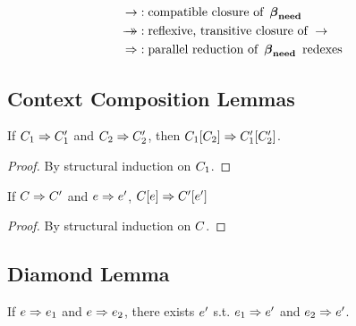 \documentclass{article}
\begin{document}

%
\begin{align*}
\step&: \textrm{compatible closure of } \betaneednr \\
\steps&: \textrm{reflexive, transitive closure of } \step \\
\pstep&: \textrm{parallel reduction of } \betaneednr \textrm{ redexes}
\end{align*}





%
%

\subsection{Context Composition Lemmas}

\begin{lemma}
\label{lem:EE}
If $\C_1 \pstep \C_1'$ and $\C_2 \pstep \C_2'$, then $\inC[_1]{\C_2} \pstep
\inC[_1']{\C_2'}$.
\end{lemma}

\begin{proof}
  By structural induction on $\C_1$.
\end{proof}

\begin{lemma}
\label{lem:Ee}
If $\C \pstep \C'$ and $\e \pstep \e'$, $\inC{\e} \pstep \inC[']{\e'}$
\end{lemma}

\begin{proof}
  By structural induction on $\C$.
\end{proof}



%
%

\subsection{Diamond Lemma}

\begin{lemma}
\label{lem:diamond}
If $\e \pstep \e_1$ and $\e \pstep \e_2$, there exists $\e'$ s.t. $\e_1 \pstep
\e'$ and $\e_2 \pstep \e'$.
\end{lemma}
\end{document}
